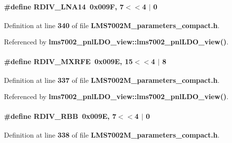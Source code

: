 \paragraph[{R\+D\+I\+V\+\_\+\+L\+N\+A14}]{\setlength{\rightskip}{0pt plus 5cm}\#define R\+D\+I\+V\+\_\+\+L\+N\+A14~0x009\+F, 7$<$$<$4 $\vert$  0}\label{LMS7002M__parameters__compact_8h_a33be82d237d91d418fdf38be45b26119}


Definition at line {\bf 340} of file {\bf L\+M\+S7002\+M\+\_\+parameters\+\_\+compact.\+h}.



Referenced by {\bf lms7002\+\_\+pnl\+L\+D\+O\+\_\+view\+::lms7002\+\_\+pnl\+L\+D\+O\+\_\+view()}.

\paragraph[{R\+D\+I\+V\+\_\+\+M\+X\+R\+FE}]{\setlength{\rightskip}{0pt plus 5cm}\#define R\+D\+I\+V\+\_\+\+M\+X\+R\+FE~0x009\+E, 15$<$$<$4 $\vert$  8}\label{LMS7002M__parameters__compact_8h_abed8bb8abf47a17f568167cf3f55fb1f}


Definition at line {\bf 337} of file {\bf L\+M\+S7002\+M\+\_\+parameters\+\_\+compact.\+h}.



Referenced by {\bf lms7002\+\_\+pnl\+L\+D\+O\+\_\+view\+::lms7002\+\_\+pnl\+L\+D\+O\+\_\+view()}.

\paragraph[{R\+D\+I\+V\+\_\+\+R\+BB}]{\setlength{\rightskip}{0pt plus 5cm}\#define R\+D\+I\+V\+\_\+\+R\+BB~0x009\+E, 7$<$$<$4 $\vert$  0}\label{LMS7002M__parameters__compact_8h_a4849666bc29ac300c9bfccdd561aacb0}


Definition at line {\bf 338} of file {\bf L\+M\+S7002\+M\+\_\+parameters\+\_\+compact.\+h}.



